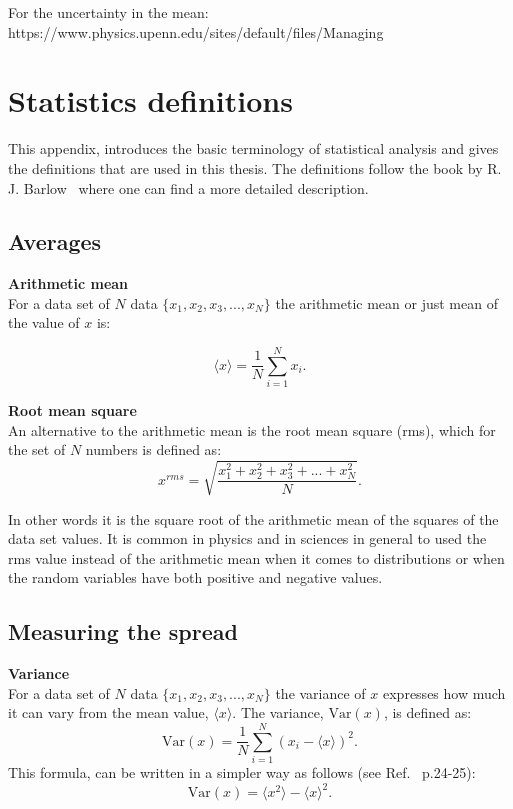 For the uncertainty in the mean:
https://www.physics.upenn.edu/sites/default/files/Managing%

\section{Statistics definitions}\label{app:statistics_definitions}
This appendix, introduces the basic terminology of statistical analysis and gives the definitions that are used in this thesis. The definitions follow the book by R. J. Barlow~\cite{lvp.b313005720130101} where one can find a more detailed description.

\subsection{Averages}
\normalsize{\textbf{Arithmetic mean}}\\
For a data set of $N$ data $\{ x_1, x_2, x_3, ..., x_N \}$ the arithmetic mean or just mean of the value of $x$ is:

\begin{equation}\label{eq:mean_def}
    \langle x \rangle = \frac{1}{N} \sum_{i=1}^{N} x_i.
\end{equation}


\normalsize{\textbf{Root mean square}}\\
An alternative to the arithmetic mean is the root mean square (rms), which for the set of $N$ numbers is defined as:
\begin{equation}\label{eq:rms_def}
    x^{rms} = \sqrt{\frac{x_1^2+x_2^2+x_3^2+...+x_N^2}{N}}.
\end{equation}

In other words it is the square root of the arithmetic mean of the squares of the data set values. It is common in physics and in sciences in general to used the rms value instead of the arithmetic mean when it comes to distributions or when the random variables have both positive and negative values.

\subsection{Measuring the spread}
\normalsize{\textbf{Variance}}\\
For a data set of $N$ data $\{ x_1, x_2, x_3, ..., x_N \}$ the variance of $x$  expresses how much it can vary from the mean value, $\langle x \rangle$. The variance, $\mathrm{Var}(x)$, is defined as:
\begin{equation}\label{eq:var_def_1}
    \mathrm{Var}(x) = \frac{1}{N} \sum_{i=1}^{N} (x_i-\langle x \rangle)^2.
\end{equation}
This formula, can be written in a simpler way as follows (see Ref.~\cite{lvp.b313005720130101} p.24-25):
\begin{equation}\label{eq:var_def_2}
    \mathrm{Var}(x) = \langle x^2 \rangle - \langle x \rangle^2.
\end{equation}

